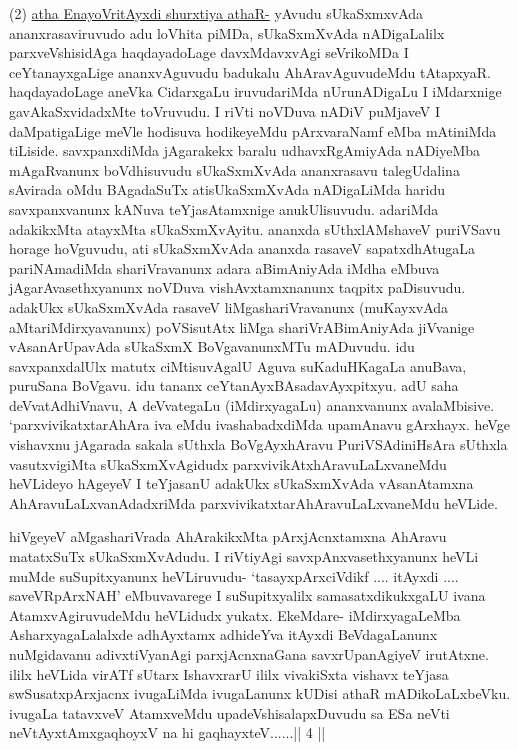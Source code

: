 \begin{artha}
(2) \underline{atha EnayoVritAyxdi shurxtiya athaR-} yAvudu sUkaSxmxvAda ananxrasaviruvudo adu loVhita piMDa, sUkaSxmXvAda nADigaLalilx parxveVshisidAga haqdayadoLage davxMdavxvAgi seVrikoMDa I ceYtanayxgaLige ananxvAguvudu badukalu AhAravAguvudeMdu tAtapxyaR. haqdayadoLage aneVka CidarxgaLu iruvudariMda nUrunADigaLu I iMdarxnige gavAkaSxvidadxMte toVruvudu. I riVti noVDuva nADiV puMjaveV I daMpatigaLige meVle hodisuva hodikeyeMdu pArxvaraNamf eMba mAtiniMda tiLiside. savxpanxdiMda jAgarakekx baralu udhavxRgAmiyAda nADiyeMba mAgaRvanunx boVdhisuvudu sUkaSxmXvAda ananxrasavu talegUdalina sAvirada oMdu BAgadaSuTx atisUkaSxmXvAda nADigaLiMda haridu savxpanxvanunx kANuva teYjasAtamxnige anukUlisuvudu. adariMda adakikxMta atayxMta sUkaSxmXvAyitu. ananxda sUthxlAMshaveV puriVSavu horage hoVguvudu, ati sUkaSxmXvAda ananxda rasaveV sapatxdhAtugaLa pariNAmadiMda shariVravanunx adara aBimAniyAda iMdha eMbuva jAgarAvasethxyanunx noVDuva vishAvxtamxnanunx taqpitx paDisuvudu. adakUkx sUkaSxmXvAda rasaveV liMgashariVravanunx (muKayxvAda aMtariMdirxyavanunx) poVSisutAtx liMga shariVrABimAniyAda jiVvanige vAsanArUpavAda sUkaSxmX BoVgavanunxMTu mADuvudu. idu savxpanxdalUlx matutx ciMtisuvAgalU Aguva suKaduHKagaLa anuBava, puruSana BoVgavu. idu tananx ceYtanAyxBAsadavAyxpitxyu. adU saha deVvatAdhiVnavu, A deVvategaLu (iMdirxyagaLu) ananxvanunx avalaMbisive. `parxvivikatxtarAhAra iva eMdu ivashabadxdiMda upamAnavu gArxhayx. heVge vishavxnu jAgarada sakala sUthxla BoVgAyxhAravu PuriVSAdiniHsAra sUthxla vasutxvigiMta sUkaSxmXvAgidudx parxvivikAtxhAravuLaLxvaneMdu heVLideyo hAgeyeV I teYjasanU adakUkx sUkaSxmXvAda vAsanAtamxna AhAravuLaLxvanAdadxriMda parxvivikatxtarAhAravuLaLxvaneMdu heVLide.
\end{artha}

\begin{artha}
hiVgeyeV aMgashariVrada AhArakikxMta pArxjAcnxtamxna AhAravu matatxSuTx sUkaSxmXvAdudu. I riVtiyAgi savxpAnxvasethxyanunx heVLi muMde suSupitxyanunx heVLiruvudu- `tasayxpArxciVdikf .... itAyxdi .... saveVRpArxNAH' eMbuvavarege I suSupitxyalilx samasatxdikukxgaLU ivana AtamxvAgiruvudeMdu heVLidudx yukatx. EkeMdare- iMdirxyagaLeMba AsharxyagaLalalxde adhAyxtamx adhideYva itAyxdi BeVdagaLanunx nuMgidavanu adivxtiVyanAgi parxjAcnxnaGana savxrUpanAgiyeV irutAtxne. ililx heVLida virATf sUtarx IshavxrarU ililx vivakiSxta vishavx teYjasa swSusatxpArxjacnx ivugaLiMda ivugaLanunx kUDisi athaR mADikoLaLxbeVku. ivugaLa tatavxveV AtamxveMdu upadeVshisalapxDuvudu sa ESa neVti neVtAyxtAmx\s gaqhoyxV na hi gaqhayxteV......|| 4 || 
\end{artha}

